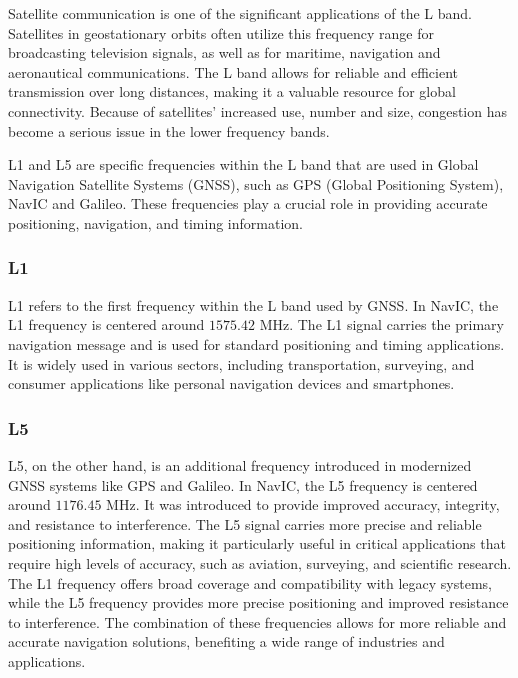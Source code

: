 \noindent Satellite communication is one of the significant applications of the L band. Satellites in geostationary orbits often utilize this frequency range for broadcasting television signals, as well as for maritime, navigation and aeronautical communications. The L band allows for reliable and efficient transmission over long distances, making it a valuable resource for global connectivity. Because of satellites’ increased use, number and size, congestion has become a serious issue in the lower frequency bands.

\noindent L1 and L5 are specific frequencies within the L band that are used in Global Navigation Satellite Systems (GNSS), such as GPS (Global Positioning System), NavIC and Galileo. These frequencies play a crucial role in providing accurate positioning, navigation, and timing information.
\subsubsection{L1} 
L1 refers to the first frequency within the L band used by GNSS. In NavIC, the L1 frequency is centered around $1575.42$ MHz. The L1 signal carries the primary navigation message and is used for standard positioning and timing applications. It is widely used in various sectors, including transportation, surveying, and consumer applications like personal navigation devices and smartphones.
\subsubsection{L5}
L5, on the other hand, is an additional frequency introduced in modernized GNSS systems like GPS and Galileo. In NavIC, the L5 frequency is centered around $1176.45$ MHz. It was introduced to provide improved accuracy, integrity, and resistance to interference. The L5 signal carries more precise and reliable positioning information, making it particularly useful in critical applications that require high levels of accuracy, such as aviation, surveying, and scientific research.
The L1 frequency offers broad coverage and compatibility with legacy systems, while the L5 frequency provides more precise positioning and improved resistance to interference. The combination of these frequencies allows for more reliable and accurate navigation solutions, benefiting a wide range of industries and applications.
